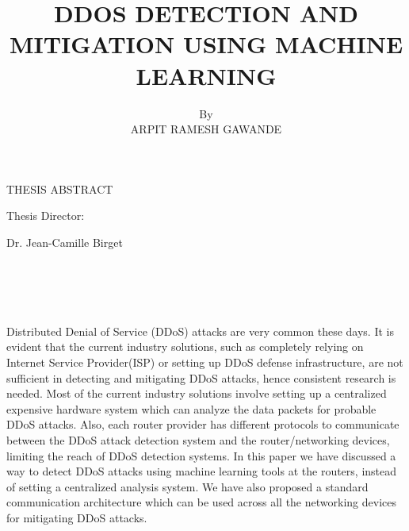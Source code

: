 \documentclass[12pt,oneside,a4paper]{article}
\title{DDOS DETECTION AND MITIGATION USING MACHINE LEARNING}
\author{By \\ ARPIT RAMESH GAWANDE}
\date{}
\begin{document}
\renewcommand{\thepage}{\roman{page}}%
\setcounter{page}{2}%
\makeatletter
{\centering THESIS ABSTRACT \par
\vspace{3mm}
\large\@title \par
\vspace{3mm}
\@author \par
\vspace{3mm}
Thesis Director: \par
Dr. Jean-Camille Birget \par}
\\~\\~\\~\\
Distributed Denial of Service (DDoS) attacks are very common these days\cite{ddos-attack-news}. It is evident that the current industry solutions, such as completely relying on Internet Service Provider(ISP) or setting up DDoS defense infrastructure, are not sufficient in detecting and mitigating DDoS attacks, hence consistent research is needed. Most of the current industry solutions involve setting up a centralized expensive hardware system which can analyze the data packets for probable DDoS attacks. Also, each router provider has different protocols to communicate between the DDoS attack detection system and the router/networking devices, limiting the reach of DDoS detection systems. In this paper we have discussed a way to detect DDoS attacks using machine learning tools at the routers, instead of setting a centralized analysis system. We have also proposed a standard communication architecture which can be used across all the networking devices for mitigating DDoS attacks.
\end{document}
